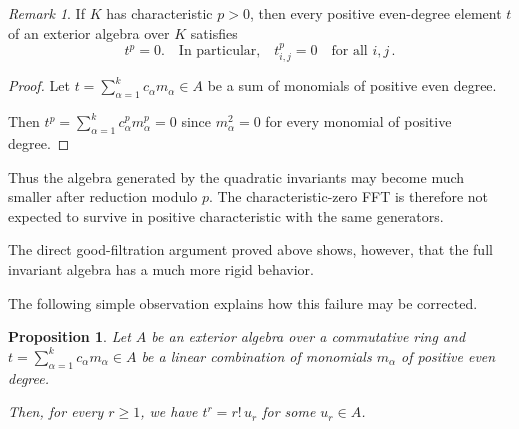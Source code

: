 \documentclass[10pt]{amsart}
\newtheorem{proposition}[theorem]{Proposition}
\theoremstyle{definition}
\theoremstyle{remark}
\newtheorem{remark}[theorem]{Remark}
\begin{document}
\begin{remark}
\label{cor:p-nilpotence}
If \(K\) has characteristic \(p>0\), then every positive even-degree
element \(t\) of an exterior algebra over \(K\) satisfies
\[
t^p=0.\quad \text{
In particular,}\quad
t_{i,j}^p=0\quad\text{for all \(i,j\)}\,.
\]
 
\end{remark}
\begin{proof}
Let
\(t=\sum_{\alpha=1}^kc_\alpha m_\alpha\in A\) be a sum of monomials of positive even degree.

Then \(t^p=\sum_{\alpha=1}^kc^p_\alpha m^p_\alpha=0\) since  $m_\alpha^2=0$  for every  monomial of positive degree.
\end{proof}
Thus the algebra generated by the quadratic invariants may become much
smaller after reduction modulo \(p\).  The characteristic-zero FFT is
therefore not expected to survive in positive characteristic with the
same generators.\smallskip



The direct good-filtration argument proved above shows, however, that the full
invariant algebra has a much more rigid behavior.
\medskip

The following simple observation explains how this failure  may be corrected.

\begin{proposition}
\label{lem:factorial-powers}
Let \(A\) be an exterior algebra over a commutative ring and 
\(t=\sum_{\alpha=1}^kc_\alpha m_\alpha\in A\) be a linear combination of monomials $m_\alpha$ of positive even degree.\smallskip

  Then, for every
\(r\ge1\), we have 
$
t^r=r!\,u_r
$
for some \(u_r\in A\).
\end{proposition}
\end{document}
